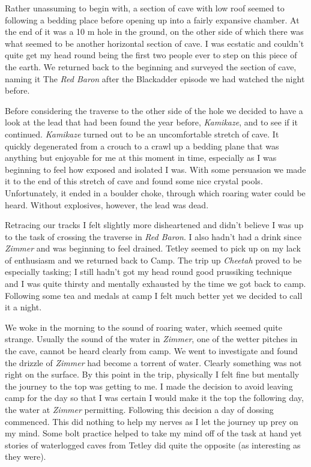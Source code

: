 Rather unassuming to begin with, a section of cave with low roof seemed
to following a bedding place before opening up into a fairly expansive
chamber. At the end of it was a 10 m hole in the ground, on the other
side of which there was what seemed to be another horizontal section of
cave. I was ecstatic and couldn't quite get my head round being the
first two people ever to step on this piece of the earth. We returned
back to the beginning and surveyed the section of cave, naming it The
\emph{Red Baron} after the Blackadder episode we had watched the night
before.

Before considering the traverse to the other side of the hole we decided
to have a look at the lead that had been found the year before,
\emph{Kamikaze}, and to see if it continued. \emph{Kamikaze} turned out
to be an uncomfortable stretch of cave. It quickly degenerated from a
crouch to a crawl up a bedding plane that was anything but enjoyable for
me at this moment in time, especially as I was beginning to feel how
exposed and isolated I was. With some persuasion we made it to the end
of this stretch of cave and found some nice crystal pools.
Unfortunately, it ended in a boulder choke, through which roaring water
could be heard. Without explosives, however, the lead was dead.

Retracing our tracks I felt slightly more disheartened and didn't
believe I was up to the task of crossing the traverse in \emph{Red
Baron}. I also hadn't had a drink since \emph{Zimmer} and was beginning
to feel drained. Tetley seemed to pick up on my lack of enthusiasm and
we returned back to Camp. The trip up \emph{Cheetah} proved to be
especially tasking; I still hadn't got my head round good prussiking
technique and I was quite thirsty and mentally exhausted by the time we
got back to camp. Following some tea and medals at camp I felt much
better yet we decided to call it a night.

We woke in the morning to the sound of roaring water, which seemed quite
strange. Usually the sound of the water in \emph{Zimmer}, one of the
wetter pitches in the cave, cannot be heard clearly from camp. We went
to investigate and found the drizzle of \emph{Zimmer} had become a
torrent of water. Clearly something was not right on the surface. By
this point in the trip, physically I felt fine but mentally the journey
to the top was getting to me. I made the decision to avoid leaving camp
for the day so that I was certain I would make it the top the following
day, the water at \emph{Zimmer} permitting. Following this decision a
day of dossing commenced. This did nothing to help my nerves as I let
the journey up prey on my mind. Some bolt practice helped to take my
mind off of the task at hand yet stories of waterlogged caves from
Tetley did quite the opposite (as interesting as they were).

